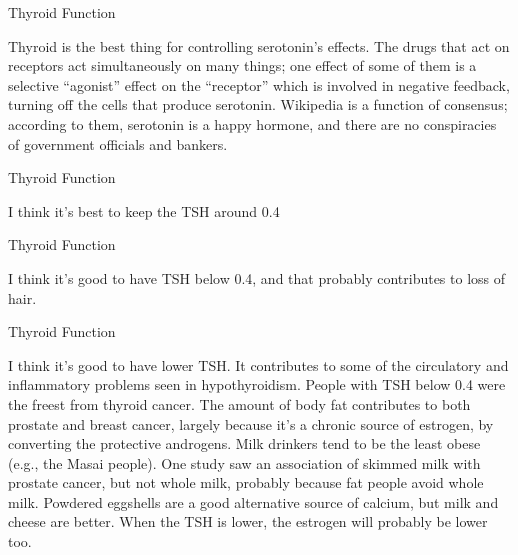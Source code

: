 \documentclass[11pt,oneside,openany,extrafontsizes]{memoir}
\begin{document}
\begin{standalonequote}{Thyroid Function}

    \begin{answer}
        Thyroid is the best thing for controlling serotonin's effects. The drugs that act on {receptors} act simultaneously on many things; one effect of some of them is a selective \enquote{agonist} effect on the \enquote{receptor} which is involved in negative feedback, turning off the cells that produce serotonin. Wikipedia is a function of consensus; according to them, serotonin is a happy hormone, and there are no conspiracies of government officials and bankers.
    \end{answer}
\end{standalonequote}

\begin{standalonequote}{Thyroid Function}

    \begin{answer}
        I think it's best to keep the TSH around 0.4
    \end{answer}
\end{standalonequote}

\begin{standalonequote}{Thyroid Function}

    \begin{answer}
        I think it's good to have TSH below 0.4, and that probably contributes to loss of hair.
    \end{answer}
\end{standalonequote}

\begin{standalonequote}{Thyroid Function}

    \begin{answer}
        I think it's good to have lower TSH. It contributes to some of the circulatory and inflammatory problems seen in hypothyroidism. People with TSH below 0.4 were the freest from thyroid cancer. The amount of body fat contributes to both prostate and breast cancer, largely because it's a chronic source of estrogen, by converting the protective androgens. Milk drinkers tend to be the least obese (e.g., the Masai people). One study saw an association of skimmed milk with prostate cancer, but not whole milk, probably because fat people avoid whole milk. Powdered eggshells are a good alternative source of calcium, but milk and cheese are better. When the TSH is lower, the estrogen will probably be lower too.
    \end{answer}
\end{standalonequote}
\end{document}
